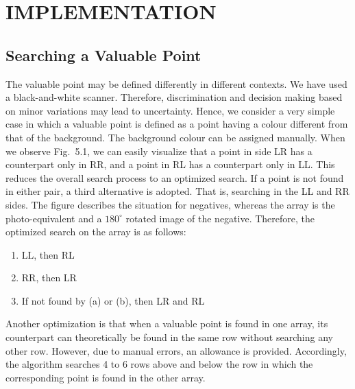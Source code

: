 \documentclass[12pt]{report}
\begin{document}
\chapter{IMPLEMENTATION} \section{Searching a Valuable Point} The valuable point may be defined differently in different contexts. We have used a black-and-white scanner. Therefore, discrimination and decision making based on minor variations may lead to uncertainty. Hence, we consider a very simple case in which a valuable point is defined as a point having a colour different from that of the background. The background colour can be assigned manually. When we observe Fig.~5.1, we can easily visualize that a point in side LR has a counterpart only in RR, and a point in RL has a counterpart only in LL. This reduces the overall search process to an optimized search. If a point is not found in either pair, a third alternative is adopted. That is, searching in the LL and RR sides. The figure describes the situation for negatives, whereas the array is the photo-equivalent and a $180^\circ$ rotated image of the negative. 
Therefore, the optimized search on the array is as follows: 
\begin{enumerate}
\item LL, then RL 
\item RR, then LR 
\item 
If not found by (a) or (b), then LR and RL 
\end{enumerate} 
Another optimization is that when a valuable point is found in one array, its counterpart can theoretically be found in the same row without searching any other row. However, due to manual errors, an allowance is provided. Accordingly, the algorithm searches 4 to 6 rows above and below the row in which the corresponding point is found in the other array. 
\end{document}
